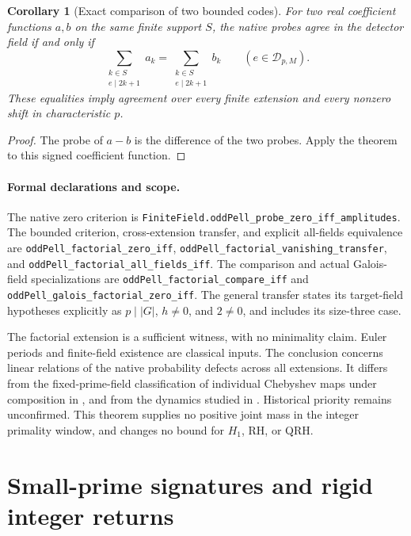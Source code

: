 \documentclass[11pt]{article}
\newtheorem{corollary}[theorem]{Corollary}
\begin{document}
\begin{corollary}[Exact comparison of two bounded codes]
\label{cor:odd-pell-finite-code-comparison}
For two real coefficient functions \(a,b\) on the same finite support
\(S\), the native probes agree in the detector field if and only if
\[
 \sum_{\substack{k\in S\\e\mid2k+1}}a_k
 =
 \sum_{\substack{k\in S\\e\mid2k+1}}b_k
 \qquad(e\in\mathcal D_{p,M}).
\]
These equalities imply agreement over every finite extension and every
nonzero shift in characteristic \(p\).
\end{corollary}
\begin{proof}
The probe of \(a-b\) is the difference of the two probes.
Apply the theorem to this signed coefficient function.
\end{proof}

\paragraph{Formal declarations and scope.}
The native zero criterion is
\texttt{FiniteField.oddPell\_probe\_zero\_iff\_amplitudes}.
The bounded criterion, cross-extension transfer, and explicit
all-fields equivalence are
\texttt{oddPell\_factorial\_zero\_iff},
\texttt{oddPell\_factorial\_vanishing\_transfer}, and
\texttt{oddPell\_factorial\_all\_fields\_iff}.
The comparison and actual Galois-field specializations are
\texttt{oddPell\_factorial\_compare\_iff} and
\texttt{oddPell\_galois\_factorial\_zero\_iff}.
The general transfer states its target-field hypotheses explicitly as
\(p\mid|G|\), \(h\ne0\), and \(2\ne0\), and includes its size-three case.

The factorial extension is a sufficient witness, with no minimality
claim.  Euler periods and finite-field existence are classical inputs.
The conclusion concerns linear relations of the native probability
defects across all extensions.  It differs from the fixed-prime-field
classification of individual Chebyshev maps under composition in
\cite{RosenScherrWeissZieveChebyshev}, and from the dynamics studied in
\cite{GassertChebyshevGraphs}.  Historical priority remains unconfirmed.
This theorem supplies no positive joint mass in the integer primality
window, and changes no bound for \(H_1\), RH, or QRH.

\section{Small-prime signatures and rigid integer returns}
\label{sec:integer-signature-return}
\end{document}
